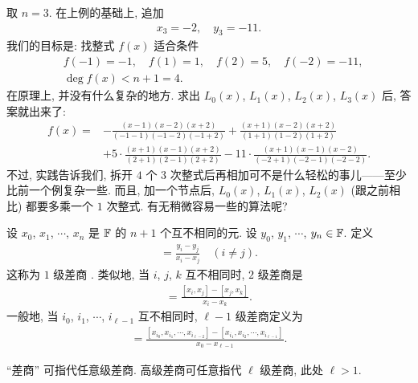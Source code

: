\begin{example}
    取 $n = 3$. 在上例的基础上, 追加
    \begin{align*}
        x_3 = -2, \quad y_3 = -11.
    \end{align*}
    我们的目标是: 找整式 $f(x)$ 适合条件
    \begin{align*}
         & f(-1) = -1, \quad f(1) = 1, \quad f(2) = 5, \quad f(-2) = -11, \\
         & \deg f(x) < n + 1 = 4.
    \end{align*}
    在原理上, 并没有什么复杂的地方. 求出 $L_0 (x)$, $L_1 (x)$, $L_2 (x)$, $L_3 (x)$ 后, 答案就出来了:
    \begin{align*}
        f(x)
        = {} & - \frac{(x-1)(x-2)(x+2)}{(-1-1)(-1-2)(-1+2)} + \frac{(x+1)(x-2)(x+2)}{(1+1)(1-2)(1+2)}                   \\
             & + 5 \cdot \frac{(x+1)(x-1)(x+2)}{(2+1)(2-1)(2+2)} - 11 \cdot \frac{(x+1)(x-1)(x-2)}{(-2+1)(-2-1)(-2-2)}.
    \end{align*}
    不过, 实践告诉我们, 拆开 $4$ 个 $3$ 次整式后再相加可不是什么轻松的事儿——至少比前一个例复杂一些. 而且, 加一个节点后, $L_0 (x)$, $L_1 (x)$, $L_2 (x)$ (跟之前相比) 都要多乘一个 $1$ 次整式. 有无稍微容易一些的算法呢?
\end{example}

\begin{definition}
    设 $x_0$, $x_1$, $\cdots$, $x_{n}$ 是 $\mathbb{F}$ 的 $n+1$ 个互不相同的元. 设 $y_0$, $y_1$, $\cdots$, $y_{n} \in \mathbb{F}$. 定义
    \begin{align*}
        [x_i, x_j] = \frac{y_i - y_j}{x_i - x_j} \quad (i \neq j).
    \end{align*}
    这称为 $1$ 级差商 . 类似地, 当 $i$, $j$, $k$ 互不相同时, $2$ 级差商是
    \begin{align*}
        [x_i, x_j, x_k] = \frac{[x_i, x_j] - [x_j, x_k]}{x_i - x_k}.
    \end{align*}
    一般地, 当 $i_0$, $i_1$, $\cdots$, $i_{\ell - 1}$ 互不相同时, $\ell - 1$ 级差商定义为
    \begin{align*}
        [x_{i_0}, x_{i_1}, \cdots, x_{i_{\ell - 1}}] = \frac{[x_{i_0}, x_{i_1}, \cdots, x_{i_{\ell - 2}}] - [x_{i_1}, x_{i_2}, \cdots, x_{i_{\ell - 1}}]}{x_0 - x_{\ell - 1}}.
    \end{align*}

    ``差商'' 可指代任意级差商. 高级差商可任意指代 $\ell$ 级差商, 此处 $\ell > 1$.
\end{definition}

